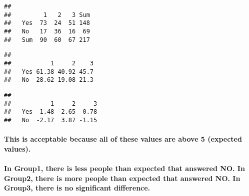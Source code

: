 \documentclass[
]{article}
\newenvironment{Shaded}{\begin{snugshade}}{\end{snugshade}}
\newcommand{\DecValTok}[1]{\textcolor[rgb]{0.00,0.00,0.81}{#1}}
\newcommand{\FunctionTok}[1]{\textcolor[rgb]{0.00,0.00,0.00}{#1}}
\newcommand{\NormalTok}[1]{#1}
\newcommand{\SpecialCharTok}[1]{\textcolor[rgb]{0.00,0.00,0.00}{#1}}
\begin{document}
\begin{Shaded}
\end{Shaded}

\begin{verbatim}
##      
##         1   2   3 Sum
##   Yes  73  24  51 148
##   No   17  36  16  69
##   Sum  90  60  67 217
\end{verbatim}

\begin{Shaded}
\end{Shaded}

\begin{verbatim}
##      
##           1     2    3
##   Yes 61.38 40.92 45.7
##   No  28.62 19.08 21.3
\end{verbatim}

\begin{Shaded}
\end{Shaded}

\begin{verbatim}
##      
##           1     2     3
##   Yes  1.48 -2.65  0.78
##   No  -2.17  3.87 -1.15
\end{verbatim}

\hypertarget{this-is-acceptable-because-all-of-these-values-are-above-5-expected-values.}{%
\paragraph{This is acceptable because all of these values are above 5
(expected
values).}\label{this-is-acceptable-because-all-of-these-values-are-above-5-expected-values.}}

\hypertarget{in-group1-there-is-less-people-than-expected-that-answered-no.-in-group2-there-is-more-people-than-expected-that-answered-no.-in-group3-there-is-no-significant-difference.}{%
\paragraph{In Group1, there is less people than expected that answered
NO. In Group2, there is more people than expected that answered NO. In
Group3, there is no significant
difference.}\label{in-group1-there-is-less-people-than-expected-that-answered-no.-in-group2-there-is-more-people-than-expected-that-answered-no.-in-group3-there-is-no-significant-difference.}}
\end{document}
